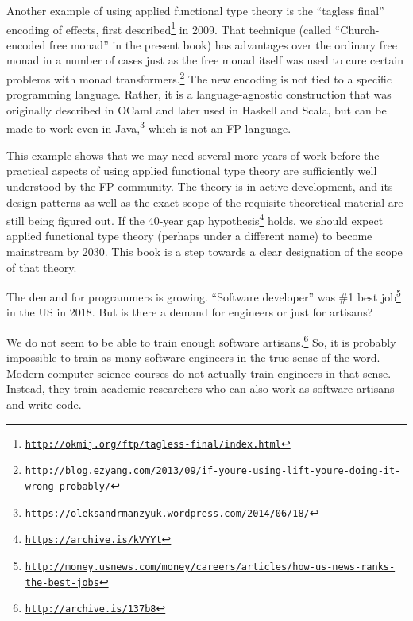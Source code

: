 Another example of using applied functional type theory is the  \textsf{``}tagless
final\textsf{''} encoding of effects, first described\footnote{\texttt{\href{http://okmij.org/ftp/tagless-final/index.html}{http://okmij.org/ftp/tagless-final/index.html}}}
in 2009. That technique (called \textsf{``}Church-encoded free monad\textsf{''}
in the present book) has advantages over the ordinary free monad in
a number of cases \textemdash{} just as the free monad itself was
used to cure certain problems with monad transformers.\footnote{\texttt{\href{http://blog.ezyang.com/2013/09/if-youre-using-lift-youre-doing-it-wrong-probably/}{http://blog.ezyang.com/2013/09/if-youre-using-lift-youre-doing-it-wrong-probably/}}}
The new encoding is not tied to a specific programming language. Rather,
it is a language-agnostic construction that was originally described
in OCaml and later used in Haskell and Scala, but can be made to work
even in Java,\footnote{\texttt{\href{https://oleksandrmanzyuk.wordpress.com/2014/06/18/}{https://oleksandrmanzyuk.wordpress.com/2014/06/18/}}}
which is not an FP language.

This example shows that we may need several more years of work before
the practical aspects of using applied functional type theory are
sufficiently well understood by the FP community. The theory is in
active development, and its design patterns \textemdash{} as well
as the exact scope of the requisite theoretical material \textemdash{}
are still being figured out. If the 40-year gap hypothesis\footnote{\texttt{\href{https://www.linkedin.com/pulse/40-year-gap-what-has-academic-computer-science-ever-done-winitzki}{https://archive.is/kVYYt}}}
holds, we should expect applied functional type theory (perhaps under
a different name) to become mainstream by 2030. This book is a step
towards a clear designation of the scope of that theory.


The demand for programmers is growing. \textsf{``}Software developer\textsf{''} was
\#1 best job\footnote{\texttt{\href{http://money.usnews.com/money/careers/articles/how-us-news-ranks-the-best-jobs}{http://money.usnews.com/money/careers/articles/how-us-news-ranks-the-best-jobs}}}
in the US in 2018. But is there a demand for engineers or just for
artisans?

We do not seem to be able to train enough software artisans.\footnote{\texttt{\href{http://archive.is/137b8}{http://archive.is/137b8}}}
So, it is probably impossible to train as many software engineers
in the true sense of the word. Modern computer science courses do
not actually train engineers in that sense. Instead, they train academic
researchers who can also work as software artisans and write code.

